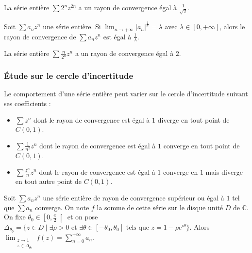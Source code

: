   \begin{example}
    La série entière $\sum 2^n z^{2n}$ a un rayon de convergence égal à $\frac{1}{\sqrt{2}}$.
  \end{example}

  \begin{corollary}
    Soit $\sum a_n z^n$ une série entière. Si $\lim_{n \rightarrow +\infty} \left| a_n \right|^{\frac{1}{n}} = \lambda$ avec $\lambda \in [0, +\infty]$, alors le rayon de convergence de $\sum a_n z^n$ est égal à $\frac{1}{\lambda}$.
  \end{corollary}

  \begin{example}
    La série entière $\sum \frac{n}{2^n} z^n$ a un rayon de convergence égal à $2$.
  \end{example}

  \subsubsection{Étude sur le cercle d'incertitude}


  \begin{example}
    Le comportement d'une série entière peut varier sur le cercle d'incertitude suivant ses coefficients :
    \begin{itemize}
      \item $\sum z^n$ dont le rayon de convergence est égal à $1$ diverge en tout point de $C(0,1)$.
      \item $\sum \frac{1}{n^2} z^n$ dont le rayon de convergence est égal à $1$ converge en tout point de $C(0,1)$.
      \item $\sum \frac{z^n}{n} z^n$ dont le rayon de convergence est égal à $1$ converge en $1$ mais diverge en tout autre point de $C(0,1)$.
    \end{itemize}
  \end{example}


  \begin{theorem}
    \label{243-1}
    Soit $\sum a_n z^n$ une série entière de rayon de convergence supérieur ou égal à $1$ tel que $\sum a_n$ converge. On note $f$ la somme de cette série sur le disque unité $D$ de $\mathbb{C}$. On fixe $\theta_0 \in \left[ 0, \frac{\pi}{2} \right[$ et on pose $\Delta_{\theta_0} = \{ z \in D \mid \exists \rho > 0 \text{ et } \exists \theta \in [-\theta_0, \theta_0] \text{ tels que } z = 1 - \rho e^{i\theta} \}$.
    \newpar
    Alors $\lim_{\substack{z \rightarrow 1 \\ z \in \Delta_{\theta_0}}} f(z) = \sum_{n=0}^{+\infty} a_n$.
  \end{theorem}

